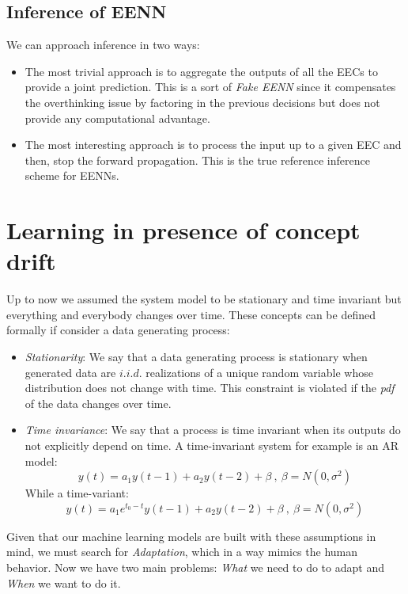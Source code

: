 \documentclass{article}
\begin{document}
    \subsection{Inference of EENN}
      We can approach inference in two ways:
      \begin{itemize}
        \item The most trivial approach is to aggregate the outputs of all the EECs to provide a joint prediction. This is a sort of \emph{Fake EENN} since it compensates the overthinking issue by factoring in the previous decisions but does not provide any computational advantage.
        \item The most interesting approach is to process the input up to a given EEC and then, stop the forward propagation. This is the true reference inference scheme for EENNs.
      \end{itemize}
   
  \section{Learning in presence of concept drift}
    Up to now we assumed the system model to be stationary and time invariant but everything and everybody changes over time. These concepts can be defined formally if consider a data generating process:
    \begin{itemize}
      \item \emph{Stationarity}: We say that a data generating process is stationary when generated data are $i.i.d.$ realizations of a unique random variable whose distribution does not change with time. This constraint is violated if the \emph{pdf} of the data changes over time.
      \item \emph{Time invariance}: We say that a process is time invariant when its outputs do not explicitly depend on time. A time-invariant system for example is an AR model:
      \begin{equation}
        y(t)= a_1 y(t-1) + a_2 y(t-2) + \beta \ , \ \beta = N(0,\sigma^2)
      \end{equation}
      While a time-variant:
      \begin{equation}
          y(t)= a_1e^{t_0 -t}y(t-1) + a_2y(t-2) + \beta \ , \ \beta = N(0,\sigma^2)
      \end{equation}
    \end{itemize}

    Given that our machine learning models are built with these assumptions in mind, we must search for \emph{Adaptation}, which in a way mimics the human behavior. Now we have two main problems: \emph{What} we need to do to adapt and \emph{When} we want to do it.
\end{document}
